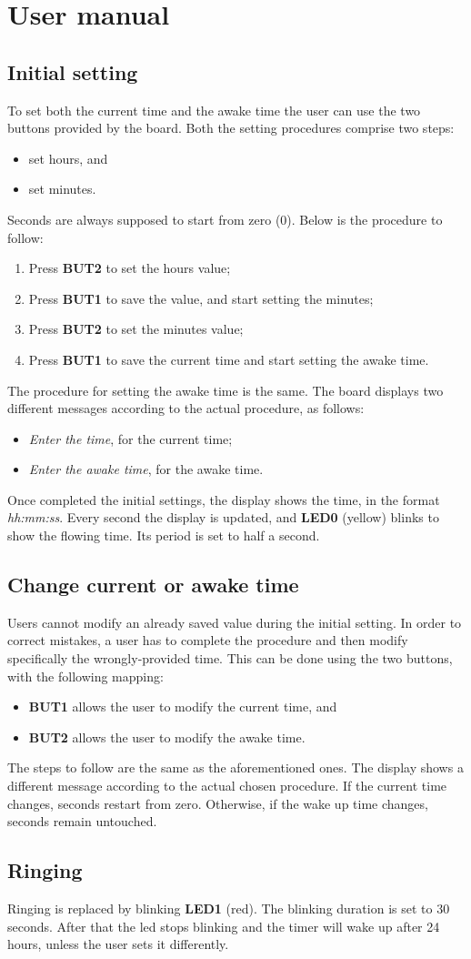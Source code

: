 \section{User manual}
\subsection{Initial setting}
To set both the current time and the awake time the user can use the two buttons provided by the board. Both the setting procedures comprise two steps:
\begin{itemize}
	\item set hours, and
	\item set minutes.
\end{itemize}
Seconds are always supposed to start from zero (0). Below is the procedure to follow:
\begin{enumerate}
	\item Press \textbf{BUT2} to set the hours value;
	\item Press \textbf{BUT1} to save the value, and start setting the minutes;
	\item Press \textbf{BUT2} to set the minutes value;
	\item Press \textbf{BUT1} to save the current time and start setting the awake time.
\end{enumerate}
The procedure for setting the awake time is the same. The board displays two different messages according to the actual procedure, as follows:
\begin{itemize}
	\item \textit{Enter the time}, for the current time;
	\item \textit{Enter the awake time}, for the awake time.
\end{itemize}
Once completed the initial settings, the display shows the time, in the format \textit{hh:mm:ss}. Every second the display is updated, and \textbf{LED0} (yellow) blinks to show the flowing time. Its period is set to half a second.

\subsection{Change current or awake time}
Users cannot modify an already saved value during the initial setting. In order to correct mistakes, a user has to complete the procedure and then modify specifically the wrongly-provided time. This can be done using the two buttons, with the following mapping:
\begin{itemize}
	\item \textbf{BUT1} allows the user to modify the current time, and
	\item \textbf{BUT2} allows the user to modify the awake time.
\end{itemize}
The steps to follow are the same as the aforementioned ones. The display shows a different message according to the actual chosen procedure. If the current time changes, seconds restart from zero. Otherwise, if the wake up time changes, seconds remain untouched.

\subsection{Ringing}
Ringing is replaced by blinking \textbf{LED1} (red). The blinking duration is set to 30 seconds. After that the led stops blinking and the timer will wake up after 24 hours, unless the user sets it differently.


